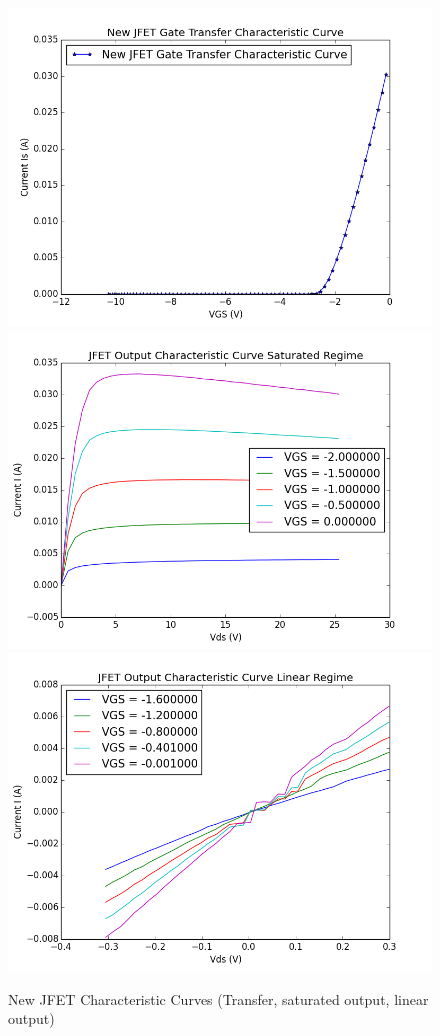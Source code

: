 \documentclass{article}
\begin{document}
    \begin{figure}[H]
        \centering
        \includegraphics[scale = 0.5]{4_10a.png}
        \includegraphics[scale = 0.5]{4_10b.png}
        \includegraphics[scale = 0.5]{4_10c.png}
        \caption{New JFET Characteristic Curves (Transfer, saturated output, linear output)}
        \label{fig:my_label}
    \end{figure}
\end{document}
